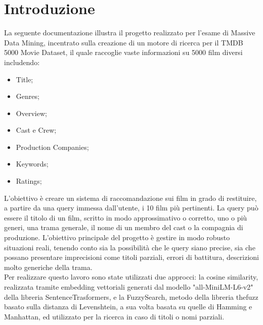 \documentclass{article}
\begin{document}
	\section{Introduzione}
	La seguente documentazione illustra il progetto realizzato per l'esame di Massive Data Mining, incentrato sulla creazione di un motore di ricerca per il TMDB 5000 Movie Dataset, il quale raccoglie vaste informazioni su 5000 film diversi includendo:
	\begin{itemize}
	\item Title;
	\item Genres;
	\item Overview;
	\item Cast e Crew;
	\item Production Companies;
	\item Keywords;
	\item Ratings;
	\end{itemize}
	L'obiettivo \`e creare un sistema di raccomandazione sui film in grado di restituire, a partire da una query immessa dall'utente, i 10 film più pertinenti. La query pu\`o essere il titolo di un film, scritto in modo approssimativo o corretto, uno o pi\`u generi, una trama generale, il nome di un membro del cast o la compagnia di produzione. L'obiettivo principale del progetto \`e gestire in modo robusto situazioni reali, tenendo conto sia la possibilit\`a che le query siano precise, sia che possano presentare imprecisioni come titoli parziali, errori di battitura, descrizioni molto generiche della trama.\\
	Per realizzare questo lavoro sono state utilizzati due approcci: la cosine similarity, realizzata tramite embedding vettoriali generati dal modello "all-MiniLM-L6-v2" della libreria SentenceTrasformers, e la FuzzySearch, metodo della libreria thefuzz basato sulla distanza di Levenshtein, a sua volta basata su quelle di Hamming e Manhattan, ed utilizzato per la ricerca in caso di titoli o nomi parziali. 
	
\end{document}
